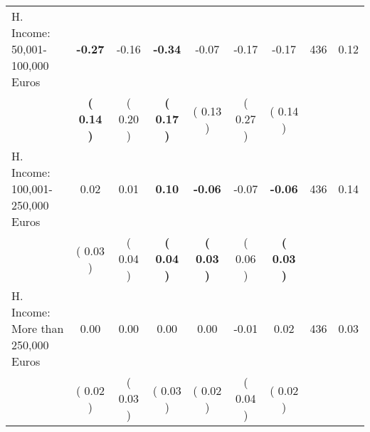 \begin{tabular}{lcccccccc}
H. Income: 50,001-100,000 Euros & \textbf{    -0.27} &     -0.16 & \textbf{    -0.34} &     -0.07 &     -0.17 &     -0.17 & 436 &       0.12 \\ 
 & \textbf{(     0.14 )} & (     0.20 ) & \textbf{(     0.17 )} & (     0.13 ) & (     0.27 ) & (     0.14 ) & \\
H. Income: 100,001-250,000 Euros &      0.02 &      0.01 & \textbf{     0.10} & \textbf{    -0.06} &     -0.07 & \textbf{    -0.06} & 436 &       0.14 \\ 
 & (     0.03 ) & (     0.04 ) & \textbf{(     0.04 )} & \textbf{(     0.03 )} & (     0.06 ) & \textbf{(     0.03 )} & \\
H. Income: More than 250,000 Euros &      0.00 &      0.00 &      0.00 &      0.00 &     -0.01 &      0.02 & 436 &       0.03 \\ 
 & (     0.02 ) & (     0.03 ) & (     0.03 ) & (     0.02 ) & (     0.04 ) & (     0.02 ) & \\
\bottomrule
\end{tabular}
